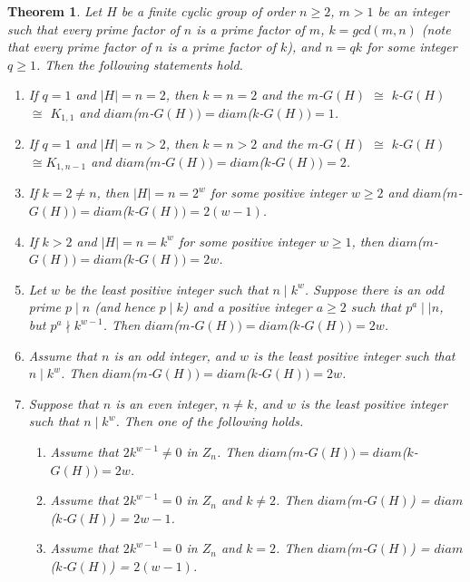 \documentclass{amsart}
\newtheorem{thm}{Theorem}[section]
\theoremstyle{plain}
\begin{document}
		\begin{thm}\label{DIM0}
			Let $H$ be a finite cyclic group of order $n \geq 2$, $m > 1$ be an integer such that every prime factor of $n$ is a prime factor of $m$,  $k = gcd(m, n)$ (note that every prime factor of $n$ is a prime factor of $k$), and $n = qk$ for some integer $q \geq 1$. Then the following statements hold.
			\begin{enumerate}
			\item If $q = 1$ and $|H| = n = 2$, then $k = n = 2$ and the $m$-$G(H)$ $\cong$ $k$-$G(H)$ $\cong$  $K_{1, 1}$ and $diam$($m$-$G(H)) = diam$($k$-$G(H)) = 1$.
			\item If $q = 1$ and $|H| = n > 2$, then $k = n > 2$ and the $m$-$G(H)$ $\cong $ $k$-$G(H)$ $\cong K_{1, n-1}$ and $diam$($m$-$G(H)) = diam$($k$-$G(H)) = 2$.
			\item  If $k = 2 \not = n$, then $|H| = n = 2^w$ for some positive integer $w \geq 2$ and  $diam$($m$-$G(H)) = diam$($k$-$G(H)) = 2(w - 1)$. 			
			\item If $k > 2$ and $|H| = n = k^w$ for some positive integer $w \geq 1$, then  $diam$($m$-$G(H)) = diam$($k$-$G(H)) = 2w$.
			\item Let $w$ be the least positive integer such that $n \mid k^w$. Suppose there is an odd prime $p \mid n$ (and hence $p \mid k$) and a positive integer $a\geq 2$ such that $p^a\mid \mid n$, but $p^a \nmid k^{w-1}$.  Then $diam$($m$-$G(H)) = diam$($k$-$G(H)) = 2w$.
			\item Assume that $n$ is an odd integer, and $w$ is the least positive integer such that $n \mid k^w$. Then $diam$($m$-$G(H)) = diam$($k$-$G(H)) = 2w$.
			\item Suppose that $n$ is an even integer, $ n \not = k$, and $w$ is the least positive integer such that $n \mid k^w$.  Then one of the following holds.
			\begin{enumerate}
				\item Assume that $2k^{w-1} \not = 0$ in $Z_n$. Then $diam$($m$-$G(H)) = diam$($k$-$G(H)) = 2w$.
				\item Assume that $2k^{w-1} = 0$ in $Z_n$ and $k \not = 2$. Then $diam$($m$-$G(H)$) = $diam$($k$-$G(H)$) = $2w - 1$.
				\item Assume that  $2k^{w-1} = 0$ in $Z_n$ and $k = 2$. Then $diam$($m$-$G(H)$) = $diam$($k$-$G(H)$) = $2(w - 1)$.
			\end{enumerate}
			\end{enumerate}
		\end{thm}		
\end{document}
